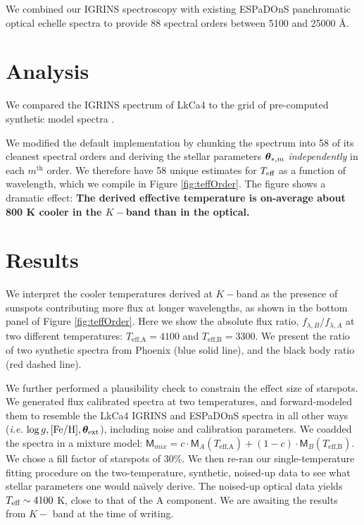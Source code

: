 \documentclass[onecolumn]{emulateapj}%
\newcommand{\name}{LkCa4 }
\begin{document}
We combined our IGRINS spectroscopy with existing ESPaDOnS panchromatic optical echelle spectra to provide 88 spectral orders between 5100 and 25000 \AA \citep{2014MNRAS.444.3220D}.

\section{Analysis}
We compared the IGRINS spectrum of \name to the \PHOENIX grid of pre-computed synthetic model spectra \citep{2013A&A...553A...6H}.  

We modified the default implementation by chunking the spectrum into 58 of its cleanest spectral orders and deriving the stellar parameters ${\bm \theta}_{\ast,m}$ \emph{independently} in each $m^{\mathrm{th}}$ order.  We therefore have 58 unique estimates for $T_\textrm{eff}$ as a function of wavelength, which we compile in Figure \ref{fig:teffOrder}.  The figure shows a dramatic effect: \textbf{The derived effective temperature is on-average about 800 K cooler in the $K-$band than in the optical.}  

\section{Results}
We interpret the cooler temperatures derived at $K-$band as the presence of sunspots contributing more flux at longer wavelengths, as shown in the bottom panel of Figure \ref{fig:teffOrder}.  Here we show the absolute flux ratio, $f_{\lambda, B} / f_{\lambda, A}$ at two different temperatures: $T_\textrm{eff,A} = 4100$ and $T_\textrm{eff,B} = 3300$.  We present the ratio of two synthetic spectra from Phoenix (blue solid line), and the black body ratio (red dashed line).  

We further performed a plausibility check to constrain the effect size of starspots.  We generated flux calibrated spectra at two temperatures, and forward-modeled them to resemble the LkCa4 IGRINS and ESPaDOnS spectra in all other ways (\emph{i.e.} $\log g, [{\rm Fe}/{\rm H}], {\bm \theta}_{\rm ext}$), including noise and calibration parameters.  We coadded the spectra in a mixture model:  $ \mathsf{M}_{mix} = c \cdot \mathsf{M}_A(T_\textrm{eff,A}) + (1-c) \cdot \mathsf{M}_B(T_\textrm{eff,B})$.  We chose a fill factor of starspots of 30\%.  We then re-ran our single-temperature fitting procedure on the two-temperature, synthetic, noised-up data to see what stellar parameters one would na\"{\i}vely derive.  The noised-up optical data yields $T_\textrm{eff} \sim 4100$ K, close to that of the A component.  We are awaiting the results from $K-$ band at the time of writing.
\end{document}
